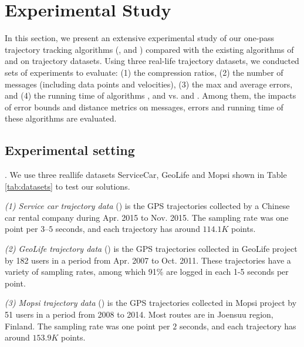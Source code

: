 \section{Experimental Study}
\label{sec-exp}



In this section, we present an extensive experimental study of our one-pass trajectory tracking algorithms (\citt, \sitt and \bitt) compared with the
existing algorithms of \ldrh and \grts on trajectory datasets. Using three real-life trajectory datasets, we conducted sets of experiments to evaluate:
(1) the compression ratios,
(2) the number of messages (including data points and velocities),
(3) the max and average errors, and
(4) the running time of algorithms \citt, \sitt and \bitt vs. \ldrh and \grts. 
Among them, the impacts of error bounds and distance metrics on messages, errors and running time of these algorithms are evaluated. 


\subsection{Experimental setting}

. We use three reallife datasets ServiceCar, GeoLife and Mopsi shown in Table \ref{tab:datasets} to test our solutions.

\vspace{0.5ex}
\ni \emph{(1) Service car trajectory data} (\sercar) is the GPS trajectories collected by a Chinese car rental company during Apr. 2015 to Nov. 2015. The sampling rate was one point per $3$--$5$ seconds, and
each trajectory has around $114.1K$ points.

\vspace{0.5ex}
\ni \emph{(2) GeoLife trajectory data} (\geolife) is the GPS trajectories collected in GeoLife project by 182 users in a period from Apr. 2007 to Oct. 2011. These trajectories have a variety of sampling rates, among which 91\% are logged in each 1-5 seconds per point. %

\vspace{0.5ex}
\ni \emph{(3) Mopsi trajectory data} (\mopsi) is the GPS trajectories collected in Mopsi project by 51 users in a period from 2008 to 2014. Most routes are in Joensuu region, Finland.
The sampling rate was one point per $2$ seconds, and each trajectory has around $153.9K$ points.

